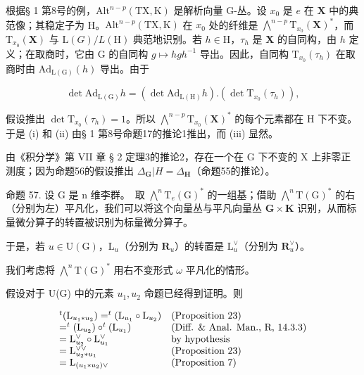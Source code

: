 根据§ 1 第8号的例，\(\mathrm{Alt}^{n - p}(\mathrm{TX},\mathrm{K})\) 是解析向量 G-丛。设 \(x_0\) 是 \(e\) 在 \(\mathbf{X}\) 中的典范像；其稳定子为 H。\(\mathrm{Alt}^{n - p}(\mathrm{TX},\mathrm{K})\) 在 \(x_0\) 处的纤维是 \(\bigwedge^{n - p}\mathrm{T}_{x_0}(\mathbf{X})^*\)，而 \(\mathrm{T}_{x_0}(\mathbf{X})\) 与 \(\mathrm{L}(G) / L(\mathrm{H})\) 典范地识别。若 \(h\in \mathrm{H}\)，\(\tau_h\) 是 \(\mathbf{X}\) 的自同构，由 \(h\) 定义；在取商时，它由 G 的自同构 \(g\mapsto hgh^{-1}\) 导出。因此，自同构 \(\mathrm{T}_{x_0}(\tau_h)\) 在取商时由 \(\mathrm{Ad}_{\mathrm{L(G)}}(h)\) 导出。由于

\[
\det \mathrm{Ad} _ {\mathrm{L(G)}} h = (\det \mathrm{Ad} _ {\mathrm{L(H)}} h). (\det \mathrm{T} _ {x _ {0}} (\tau_ {h})),
\]

假设推出 \(\det \mathrm{T}_{x_0}(\tau_h) = 1\)。所以 \(\bigwedge^{n - p}\mathrm{T}_{x_0}(\mathbf{X})^*\) 的每个元素都在 H 下不变。于是 (i) 和 (ii) 由§ 1 第8号命题17的推论1推出，而 (iii) 显然。

由《积分学》第 VII 章 § 2 定理3的推论2，存在一个在 G 下不变的 X 上非零正测度；因为命题56的假设推出 \(\Delta_{\mathbf{G}}|H = \Delta_{\mathbf{H}}\)（命题55的推论）。

命题 57. 设 G 是 n 维李群。~取 \(\bigwedge^{n}\mathrm{T}_{e}(\mathrm{G})^{*}\) 的一组基；借助 \(\bigwedge^{n}\mathrm{T}(\mathrm{G})^{*}\) 的右（分别为左）平凡化，我们可以将这个向量丛与平凡向量丛 \(\mathbf{G} \times \mathbf{K}\) 识别，从而标量微分算子的转置被识别为标量微分算子。

于是，若 \(u \in \mathrm{U}(\mathrm{G})\)，\(\mathrm{L}_u\)（分别为 \(\mathbf{R}_u\)）的转置是 \(\mathrm{L}_u^\vee\)（分别为 \(\mathbf{R}_u^\vee\)）。

我们考虑将 \(\bigwedge^{n}\mathrm{T}(\mathrm{G})^{*}\) 用右不变形式 \(\omega\) 平凡化的情形。

假设对于 U(G) 中的元素 \(u_{1}, u_{2}\) 命题已经得到证明。则

\[
\begin{array}{l l} ^ {t} (\mathrm{L} _ {u _ {1} * u _ {2}}) = ^ {t} (\mathrm{L} _ {u _ {1}} \circ \mathrm{L} _ {u _ {2}}) & \text {(Proposition 23)} \\ = ^ {t} (\mathrm{L} _ {u _ {2}}) \circ^ {t} (\mathrm{L} _ {u _ {1}}) & \text {(Diff. \& Anal. Man., R, 14.3.3)} \\ = \mathrm{L} _ {u _ {2}} ^ {\vee} \circ \mathrm{L} _ {u _ {1}} ^ {\vee} & \text {by hypothesis} \\ = \mathrm{L} _ {u _ {2} * u _ {1}} ^ {\vee \vee} & \text {(Proposition 23)} \\ = \mathrm{L} _ {(u _ {1} * u _ {2}) \vee} & \text {(Proposition 7)} \end{array}
\]

